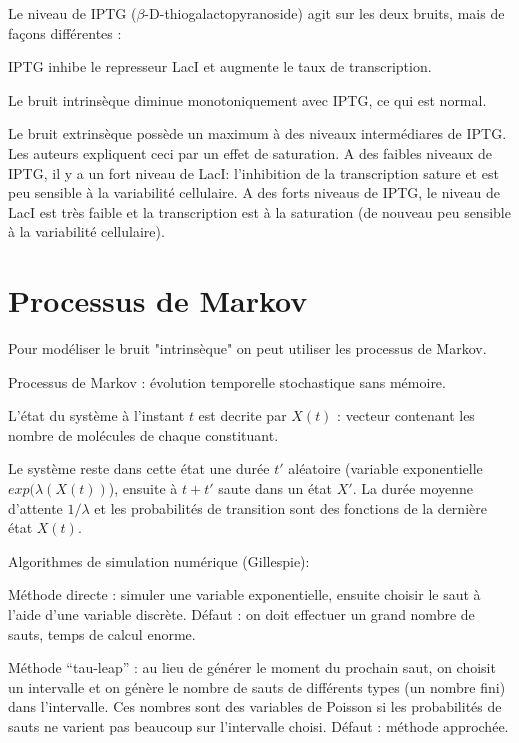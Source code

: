 \documentclass{article}
\def\magenta{\color{goldenrod}}
\begin{document}
Le niveau de IPTG ($\beta$-D-thiogalactopyranoside) agit sur les deux bruits, mais
de fa{\c c}ons diff{\'e}rentes :

IPTG inhibe le represseur LacI et augmente le taux de transcription.

Le bruit intrins{\`e}que diminue monotoniquement avec IPTG, ce qui est normal.

Le bruit extrins{\`e}que poss{\`e}de un maximum {\`a} des niveaux interm{\'e}diares de IPTG.
Les auteurs expliquent ceci par un effet de saturation. A des faibles 
niveaux de IPTG, il y a un fort niveau de LacI: l'inhibition de la 
transcription sature et est peu sensible {\`a} la variabilit{\'e} cellulaire.
A des forts niveaus de IPTG, le niveau de LacI est tr{\`e}s faible et
la transcription est {\`a} la saturation (de nouveau peu sensible {\`a} la
variabilit{\'e} cellulaire). 


\section{\magenta \textsf{\Large Processus de Markov }}

Pour mod{\'e}liser le bruit "intrins{\`e}que" on peut utiliser les
processus de Markov.

Processus de Markov : {\'e}volution temporelle stochastique sans m{\'e}moire.


L'{\'e}tat du syst{\`e}me {\`a} l'instant $t$ est decrite par $X(t)$ : vecteur
contenant les nombre de mol{\'e}cules de chaque constituant.

Le syst{\`e}me reste dans cette {\'e}tat une dur{\'e}e $t'$ al{\'e}atoire (variable
exponentielle $exp(\lambda(X(t))$), ensuite {\`a} $t+t'$ saute dans un {\'e}tat $X'$.
La dur{\'e}e moyenne d'attente $1/\lambda$ et les probabilit{\'e}s de transition
sont des fonctions de la derni{\`e}re {\'e}tat $X(t)$.


Algorithmes de simulation num{\'e}rique (Gillespie):

M{\'e}thode directe : simuler une variable exponentielle, ensuite choisir le saut
{\`a} l'aide d'une variable discr{\`e}te. D{\'e}faut : on doit effectuer un grand nombre
de sauts, temps de calcul enorme.


M{\'e}thode ``tau-leap'' : au lieu de g{\'e}n{\'e}rer le moment du prochain saut, on choisit
un intervalle et on g{\'e}n{\`e}re le nombre de sauts de diff{\'e}rents types (un nombre fini)
dans l'intervalle. Ces nombres sont des variables de Poisson si les probabilit{\'e}s
de sauts ne varient pas beaucoup sur l'intervalle choisi. D{\'e}faut : m{\'e}thode
approch{\'e}e.
\end{document}
